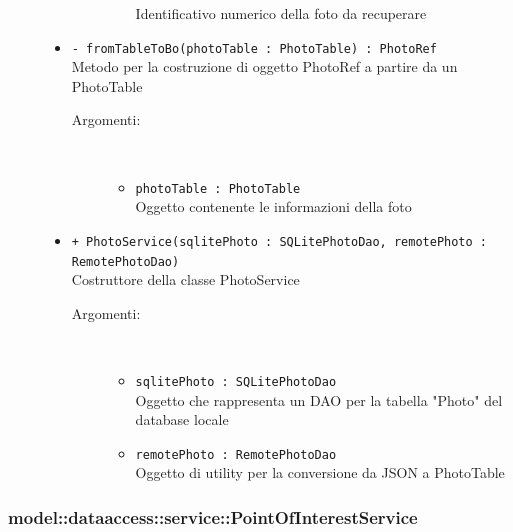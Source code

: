 \documentclass[../DefinizioneDiProdotto.tex]{subfiles}
\begin{document}
\begin{description}
\begin{itemize}
\begin{description}
\begin{itemize}
Identificativo numerico della foto da recuperare\end{itemize}
\end{description}
\item \texttt{- fromTableToBo(photoTable : PhotoTable) : PhotoRef}\\
Metodo per la costruzione di oggetto PhotoRef a partire da un PhotoTable
 \begin{description}
\item[Argomenti:] \
\begin{itemize}
\item \texttt{photoTable : PhotoTable}\\
Oggetto contenente le informazioni della foto\end{itemize}
\end{description}
\item \texttt{+ PhotoService(sqlitePhoto : SQLitePhotoDao, remotePhoto : RemotePhotoDao)}\\
Costruttore della classe PhotoService
 \begin{description}
\item[Argomenti:] \
\begin{itemize}
\item \texttt{sqlitePhoto : SQLitePhotoDao}\\
Oggetto che rappresenta un DAO per la tabella "Photo" del database locale\item \texttt{remotePhoto : RemotePhotoDao}\\
Oggetto di utility per la conversione da JSON a PhotoTable\end{itemize}
\end{description}
\end{itemize}
\end{description}

\subsubsection{model::dataaccess::service::PointOfInterestService}
\end{document}
